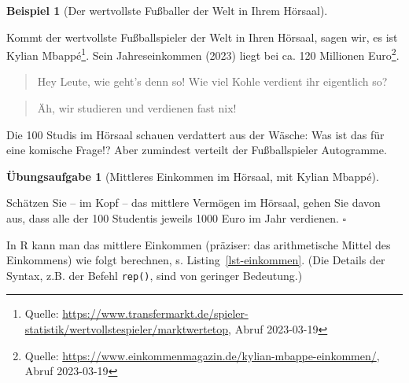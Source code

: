 \documentclass[
  letterpaper,
]{scrbook}
\theoremstyle{definition}
\newtheorem{example}{Beispiel}[chapter]
\theoremstyle{definition}
\theoremstyle{definition}
\newtheorem{exercise}{Übungsaufgabe}[chapter]
\theoremstyle{remark}
\begin{document}
\begin{example}[Der wertvollste Fußballer der Welt in Ihrem
Hörsaal]\protect\hypertarget{exm-md}{}\label{exm-md}

Kommt der wertvollste Fußballspieler der Welt in Ihren Hörsaal, sagen
wir, es ist Kylian Mbappé\footnote{Quelle:
  \url{https://www.transfermarkt.de/spieler-statistik/wertvollstespieler/marktwertetop},
  Abruf 2023-03-19}. Sein Jahreseinkommen (2023) liegt bei ca. 120
Millionen Euro\footnote{Quelle:
  \url{https://www.einkommenmagazin.de/kylian-mbappe-einkommen/}, Abruf
  2023-03-19}.

\begin{quote}
{} Hey Leute, wie geht's denn so! Wie viel Kohle
verdient ihr eigentlich so?
\end{quote}

\begin{quote}
{} Äh, wir studieren und verdienen fast nix!
\end{quote}

Die 100 Studis im Hörsaal schauen verdattert aus der Wäsche: Was ist das
für eine komische Frage!? Aber zumindest verteilt der Fußballspieler
Autogramme.

\end{example}

\begin{exercise}[Mittleres Einkommen im Hörsaal, mit Kylian
Mbappé]\protect\hypertarget{exr-elon}{}\label{exr-elon}

Schätzen Sie -- im Kopf -- das mittlere Vermögen im Hörsaal, gehen Sie
davon aus, dass alle der 100 Studentis jeweils 1000 Euro im Jahr
verdienen. \(\square\)

\end{exercise}

In R kann man das mittlere Einkommen (präziser: das arithmetische Mittel
des Einkommens) wie folgt berechnen, s. Listing~\ref{lst-einkommen}.
(Die Details der Syntax, z.B. der Befehl \texttt{rep()}, sind von
geringer Bedeutung.)
\end{document}
